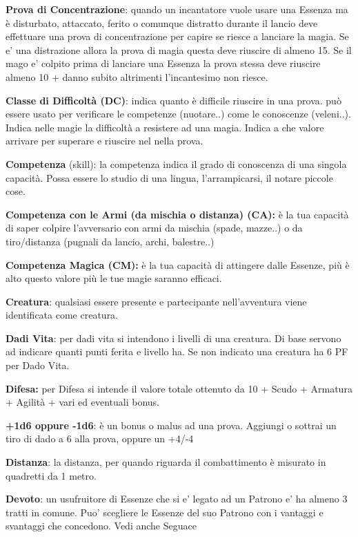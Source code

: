 \documentclass[a4paper,11pt,twoside,openany]{book}
\begin{document}
\textbf{Prova di Concentrazione}: quando un incantatore vuole usare una Essenza ma è disturbato, attaccato, ferito o comunque distratto durante il lancio deve effettuare una prova di concentrazione per capire se riesce a lanciare la magia.
Se e' una distrazione allora la prova di magia questa deve riuscire di almeno 15.
Se il mago e' colpito prima di lanciare una Essenza la prova stessa deve riuscire almeno 10 + danno subito altrimenti l'incantesimo non riesce.

\textbf{Classe di Difficoltà (DC)}: indica quanto è difficile riuscire in una prova. può essere usato per verificare le competenze (nuotare..) come le conoscenze (veleni..). Indica nelle magie la difficoltà a resistere ad una magia. Indica a che valore arrivare per superare e riuscire nel nella prova.

\textbf{Competenza} (skill): la competenza indica il grado di conoscenza di una singola capacità. Possa essere lo studio di una lingua, l'arrampicarsi, il notare piccole cose.

\textbf{Competenza con le Armi (da mischia o distanza) (CA):} è la tua capacità di saper colpire l'avversario con armi da mischia (spade, mazze..) o da tiro/distanza (pugnali da lancio, archi, balestre..)

\textbf{Competenza Magica (CM):} è la tua capacità di attingere dalle Essenze, più è alto questo valore più le tue magie saranno efficaci.

\textbf{Creatura}: qualsiasi essere presente e partecipante nell'avventura viene identificata come creatura.

\textbf{Dadi Vita}: per dadi vita si intendono i livelli di una creatura. Di base servono ad indicare quanti punti ferita e livello ha. Se non indicato una creatura ha 6 PF per Dado Vita.

\textbf{Difesa:} per Difesa si intende il valore totale ottenuto da 10 + Scudo + Armatura + Agilità + vari ed eventuali bonus.

\textbf{+1d6 oppure -1d6}: è un bonus o malus ad una prova. Aggiungi o sottrai un tiro di dado a 6 alla prova, oppure un +4/-4

\textbf{Distanza}: la distanza, per quando riguarda il combattimento è misurato in quadretti da 1 metro.

\textbf{Devoto}: un usufruitore di Essenze che si e’ legato ad un Patrono e’ ha almeno 3 tratti in comune.
Puo’ scegliere le Essenze del suo Patrono con i vantaggi e svantaggi che concedono. Vedi anche Seguace
\end{document}
